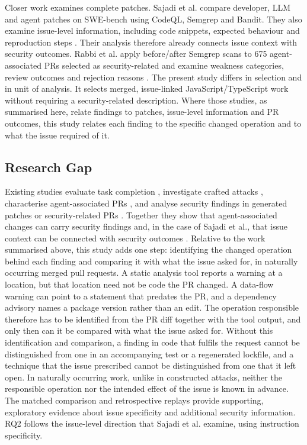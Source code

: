 \documentclass[acmsmall,screen,nonacm,review]{acmart}
\begin{document}
Closer work examines complete patches. Sajadi et al. compare developer, LLM and agent patches on SWE-bench using CodeQL, Semgrep and Bandit. They also examine issue-level information, including code snippets, expected behaviour and reproduction steps \cite{b48}. Their analysis therefore already connects issue context with security outcomes. Rabbi et al. apply before/after Semgrep scans to 675 agent-associated PRs selected as security-related and examine weakness categories, review outcomes and rejection reasons \cite{b49}. The present study differs in selection and in unit of analysis. It selects merged, issue-linked JavaScript/\allowbreak TypeScript work without requiring a security-related description. Where those studies, as summarised here, relate findings to patches, issue-level information and PR outcomes, this study relates each finding to the specific changed operation and to what the issue required of it.

\subsection{Research Gap}

Existing studies evaluate task completion \cite{b9,b22}, investigate crafted attacks \cite{b3,b16}, characterise agent-associated PRs \cite{b11,b21}, and analyse security findings in generated patches or security-related PRs \cite{b48,b49}. Together they show that agent-associated changes can carry security findings and, in the case of Sajadi et al., that issue context can be connected with security outcomes \cite{b48}. Relative to the work summarised above, this study adds one step: identifying the changed operation behind each finding and comparing it with what the issue asked for, in naturally occurring merged pull requests. A static analysis tool reports a warning at a location, but that location need not be code the PR changed. A data-flow warning can point to a statement that predates the PR, and a dependency advisory names a package version rather than an edit. The operation responsible therefore has to be identified from the PR diff together with the tool output, and only then can it be compared with what the issue asked for. Without this identification and comparison, a finding in code that fulfils the request cannot be distinguished from one in an accompanying test or a regenerated lockfile, and a technique that the issue prescribed cannot be distinguished from one that it left open. In naturally occurring work, unlike in constructed attacks, neither the responsible operation nor the intended effect of the issue is known in advance. The matched comparison and retrospective replays provide supporting, exploratory evidence about issue specificity and additional security information. RQ2 follows the issue-level direction that Sajadi et al. examine, using instruction specificity.
\end{document}
